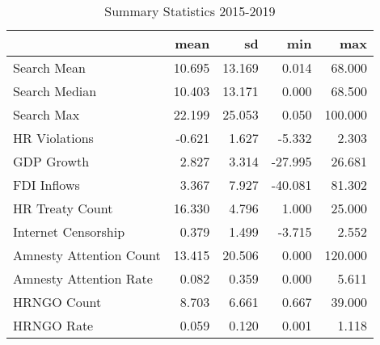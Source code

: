 \begin{table}[ht]
\centering
\begin{tabular}{|l|rrrr|}
  \hline
 & mean & sd & min & max \\ 
  \hline
Search Mean & 10.695 & 13.169 & 0.014 & 68.000 \\ 
  Search Median & 10.403 & 13.171 & 0.000 & 68.500 \\ 
  Search Max & 22.199 & 25.053 & 0.050 & 100.000 \\ 
  HR Violations & -0.621 & 1.627 & -5.332 & 2.303 \\ 
  GDP Growth & 2.827 & 3.314 & -27.995 & 26.681 \\ 
  FDI Inflows & 3.367 & 7.927 & -40.081 & 81.302 \\ 
  HR Treaty Count & 16.330 & 4.796 & 1.000 & 25.000 \\ 
  Internet Censorship & 0.379 & 1.499 & -3.715 & 2.552 \\ 
  Amnesty Attention Count & 13.415 & 20.506 & 0.000 & 120.000 \\ 
  Amnesty Attention Rate & 0.082 & 0.359 & 0.000 & 5.611 \\ 
  HRNGO Count & 8.703 & 6.661 & 0.667 & 39.000 \\ 
  HRNGO Rate & 0.059 & 0.120 & 0.001 & 1.118 \\ 
   \hline
\end{tabular}
\caption{Summary Statistics 2015-2019} 
\end{table}
